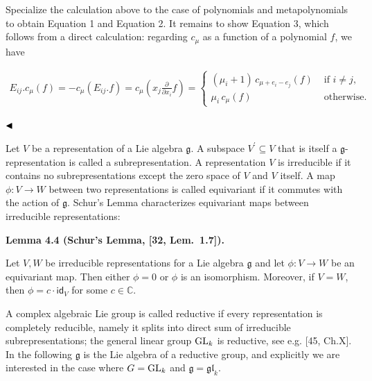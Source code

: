\documentclass[10pt,a4paper]{article}
\begin{document}
Specialize the calculation above to the case of polynomials and metapolynomials to obtain Equation 1 and Equation 2. It remains to show Equation 3, which follows from a direct calculation: regarding $c_{\mu}$ as a function of a polynomial $f$, we have



\[\begin{aligned}
E_{ij}.c_{\mu}(f)=-c_{\mu}(E_{ij}.f)=c_{\mu}(x_{j}\frac{\partial}{\partial x_{i}}f)=\begin{cases}(\mu_{i}+1)\,c_{\mu+e_{i}-e_{j}}(f)&\text{ if }i\neq j,\\ \mu_{i}\,c_{\mu}(f)&\text{ otherwise}.\end{cases}\ 
\end{aligned}\]


$\hfill\blacktriangleleft$





Let $V$ be a representation of a Lie algebra $\mathfrak{g}$. A subspace $V^{\prime}\subseteq V$ that is itself a $\mathfrak{g}$-representation is called a subrepresentation. A representation $V$ is irreducible if it contains no subrepresentations except the zero space of $V$ and $V$ itself. A map $\phi:V\to W$ between two representations is called equivariant if it commutes with the action of $\mathfrak{g}$. Schur’s Lemma characterizes equivariant maps between irreducible representations:





\par\medskip\noindent\textbf{Lemma 4.4 (Schur’s Lemma, [32, Lem. 1.7]).}\par



Let $V,W$ be irreducible representations for a Lie algebra $\mathfrak{g}$ and let $\phi:V\to W$ be an equivariant map. Then either $\phi=0$ or $\phi$ is an isomorphism. Moreover, if $V=W$, then $\phi=c\cdot\mathsf{id}_{V}$ for some $c\in\mathbb{C}$.






A complex algebraic Lie group is called reductive if every representation is completely reducible, namely it splits into direct sum of irreducible subrepresentations; the general linear group $\textnormal{GL}_{k}$ is reductive, see e.g. [45, Ch.X]. In the following $\mathfrak{g}$ is the Lie algebra of a reductive group, and explicitly we are interested in the case where $G=\textnormal{GL}_{k}$ and $\mathfrak{g}=\mathfrak{gl}_{k}$.
\end{document}
